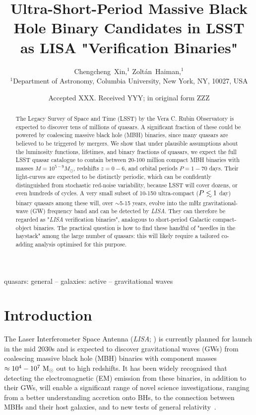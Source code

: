 \documentclass[fleqn,usenatbib]{mnras}
\title[Periodic Quasars in LSST as future LISA sources]{Ultra-Short-Period Massive Black Hole Binary Candidates in LSST as LISA "Verification Binaries"}
\author[Xin \& Haiman]{Chengcheng~Xin,$^{1}$
Zolt{\'{a}}n~Haiman,$^{1}$ \\
$^{1}$Department of Astronomy, Columbia University, New York, NY, 10027, USA\\}
\date{Accepted XXX. Received YYY; in original form ZZZ}
\newcommand\lsim{\mathrel{\rlap{\lower4pt\hbox{\hskip1pt$\sim$}}
        \raise1pt\hbox{$<$}}}
\begin{document}
\label{firstpage}
\pagerange{\pageref{firstpage}--\pageref{lastpage}}
\maketitle


\begin{abstract}
The Legacy Survey of Space and Time (LSST) by the Vera C. Rubin Observatory is expected to discover tens of millions
of quasars.
A significant fraction of these could be powered by coalescing massive black hole (MBH) binaries, since many quasars are believed to be triggered by mergers.
We show that under plausible assumptions about the luminosity functions, lifetimes, and binary fractions of quasars, we expect the full LSST quasar catalogue to contain 
between 20-100 million compact MBH binaries with masses $M=10^{5-9}M_{\odot}$, redshifts $z=0-6$, and orbital periods $P=1-70$ days. 
Their light-curves are expected to be distinctly periodic, which can be confidently distinguished from stochastic red-noise variability, because LSST will cover dozens, or even hundreds of cycles.
A very small subset of 10-150 ultra-compact ($P\lsim 1$ day) 
binary quasars among these will, over $\sim$5-15 years, evolve into
the mHz gravitational-wave (GW) frequency band and can be detected by {\it LISA}.  They can therefore be regarded as "{\it LISA} verification binaries", analogous to short-period Galactic compact-object binaries.   The practical question is how to find these handful of "needles in the haystack" among the large number of quasars: this will likely require a tailored co-adding analysis optimised for this purpose.
\end{abstract}

\begin{keywords}
quasars: general  -- galaxies: active -- gravitational waves
\end{keywords}


\section{Introduction}\label{sec:intro}

The Laser Interferometer Space Antenna ({\it LISA}; \citealt{LISA}) is currently planned for launch in the mid 2030s and is expected to discover gravitational waves (GWs) from coalescing massive black hole (MBH) binaries with component masses $\approx 10^4-10^7~{\rm M_\odot}$ out to high redshifts.  It has been widely recognised that detecting the electromagnetic (EM) emission from these binaries, in addition to their GWs, will enable a significant range of novel science investigations, ranging from a better understanding accretion onto BHs, to the connection between MBHs and their host galaxies, and to new tests of general relativity~\citep{MMMBA-decadal}.
\end{document}
